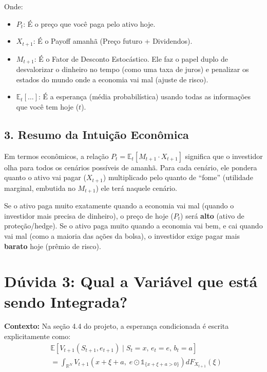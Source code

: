 \documentclass[12pt,a4paper]{article}
\begin{document}
Onde:
\begin{itemize}
    \item \textbf{$P_t$}: É o preço que você paga pelo ativo hoje.
    \item \textbf{$X_{t+1}$}: É o Payoff amanhã (Preço futuro + Dividendos).
    \item \textbf{$M_{t+1}$}: É o Fator de Desconto Estocástico. Ele faz o papel duplo de desvalorizar o dinheiro no tempo (como uma taxa de juros) e penalizar os estados do mundo onde a economia vai mal (ajuste de risco).
    \item \textbf{$\mathbb{E}_t[\dots]$}: É a esperança (média probabilística) usando todas as informações que você tem hoje ($t$).
\end{itemize}

\subsection{3. Resumo da Intuição Econômica}

Em termos econômicos, a relação $P_t = \mathbb{E}_t [ M_{t+1} \cdot X_{t+1} ]$ significa que o investidor olha para todos os cenários possíveis de amanhã. Para cada cenário, ele pondera quanto o ativo vai pagar ($X_{t+1}$) multiplicado pelo quanto de ``fome'' (utilidade marginal, embutida no $M_{t+1}$) ele terá naquele cenário.

Se o ativo paga muito exatamente quando a economia vai mal (quando o investidor mais precisa de dinheiro), o preço de hoje ($P_t$) será \textbf{alto} (ativo de proteção/hedge). Se o ativo paga muito quando a economia vai bem, e cai quando vai mal (como a maioria das ações da bolsa), o investidor exige pagar mais \textbf{barato} hoje (prêmio de risco).

\section{Dúvida 3: Qual a Variável que está sendo Integrada?}

\textbf{Contexto:} Na seção 4.4 do projeto, a esperança condicionada é escrita explicitamente como:
\begin{align}
    &\mathbb{E}\left[V_{t+1}(S_{t+1}, e_{t+1}) \mid S_t = x,\, e_t = e,\, b_t = a\right] \tag{7} \\
    &= \int_{\mathbb{R}^N} V_{t+1}\!\left(x + \xi + a,\; e \odot \mathbb{1}_{\{x+\xi+a>0\}}\right) dF_{X_{t+1}}(\xi) \tag{8}
\end{align}
\end{document}
